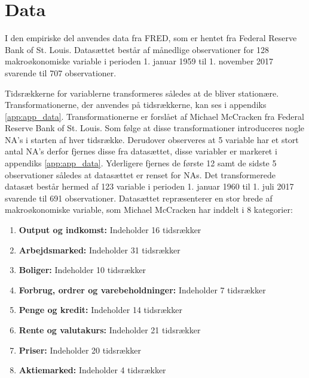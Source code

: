 \chapter{Data}
I den empiriske del anvendes data fra FRED, som er hentet fra Federal Reserve Bank of St. Louis.
Datasættet består af månedlige observationer for 128 makroøkonomiske variable i perioden 1. januar 1959 til 1. november 2017 svarende til 707 observationer.

Tidsrækkerne for variablerne transformeres således at de bliver stationære.
Transformationerne, der anvendes på tidsrækkerne, kan ses i appendiks \ref{app:app_data}.
Transformationerne er forslået af Michael McCracken fra Federal Reserve Bank of St. Louis.  
Som følge at disse transformationer introduceres nogle NA's i starten af hver tidsrække.
Derudover observeres at 5 variable har et stort antal NA's derfor fjernes disse fra datasættet, disse variabler er markeret i appendiks \ref{app:app_data}.
Yderligere fjernes de første 12 samt de sidste 5 observationer således at datasættet er renset for NAs.
Det transformerede datasæt består hermed af 123 variable i perioden 1. januar 1960 til 1. juli 2017 svarende til 691 observationer.
%
Datasættet repræsenterer en stor brede af makroøkonomiske variable, som Michael McCracken har inddelt i 8 kategorier: 
\begin{enumerate}
\item \textbf{Output og indkomst:} Indeholder 16 tidsrækker
\item \textbf{Arbejdsmarked:}  Indeholder 31 tidsrækker
\item \textbf{Boliger:} Indeholder 10 tidsrækker
\item \textbf{Forbrug, ordrer og varebeholdninger:} Indeholder 7 tidsrækker
\item \textbf{Penge og kredit:} Indeholder 14 tidsrækker
\item\textbf{ Rente og valutakurs:} Indeholder 21 tidsrækker
\item \textbf{Priser:} Indeholder 20 tidsrækker
\item \textbf{Aktiemarked:} Indeholder 4 tidsrækker
\end{enumerate}
